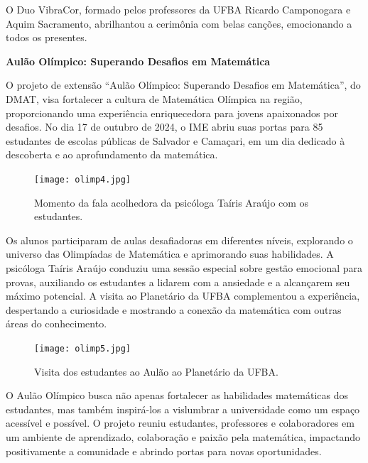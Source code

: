 \documentclass{hipatia}
\begin{document}
O Duo VibraCor, formado pelos professores da UFBA Ricardo Camponogara e Aquim Sacramento, abrilhantou a cerimônia com belas canções, emocionando a todos os presentes.


\vspace{0.5cm}

{\bf \noindent Aulão Olímpico: Superando Desafios em Matemática}

\vspace{0.5cm}

O projeto de extensão ``Aulão Olímpico: Superando Desafios em Matemática”, do DMAT, visa fortalecer a cultura de Matemática Olímpica na região, proporcionando uma experiência enriquecedora para jovens apaixonados por desafios. No dia 17 de outubro de 2024, o IME abriu suas portas para 85 estudantes de escolas públicas de Salvador e Camaçari, em um dia dedicado à descoberta e ao aprofundamento da matemática.

\begin{figure}[htb]
    \centering
    \texttt{[image: olimp4.jpg]}
    \caption{Momento da fala acolhedora da psicóloga Taíris Araújo com os estudantes.}
 \label{olimp4}
\end{figure}

Os alunos participaram de aulas desafiadoras em diferentes níveis, explorando o universo das Olimpíadas de Matemática e aprimorando suas habilidades. A psicóloga Taíris Araújo conduziu uma sessão especial sobre gestão emocional para provas, auxiliando os estudantes a lidarem com a ansiedade e a alcançarem seu máximo potencial. A visita ao Planetário da UFBA complementou a experiência, despertando a curiosidade e mostrando a conexão da matemática com outras áreas do conhecimento.

\begin{figure}[htb]
    \centering
    \texttt{[image: olimp5.jpg]}
    \caption{Visita dos estudantes ao Aulão ao Planetário da UFBA.}
 \label{olimp5}
\end{figure}

O Aulão Olímpico busca não apenas fortalecer as habilidades matemáticas dos estudantes, mas também inspirá-los a vislumbrar a universidade como um espaço acessível e possível. O projeto reuniu estudantes, professores e colaboradores em um ambiente de aprendizado, colaboração e paixão pela matemática, impactando positivamente a comunidade e abrindo portas para novas oportunidades.
\end{document}

